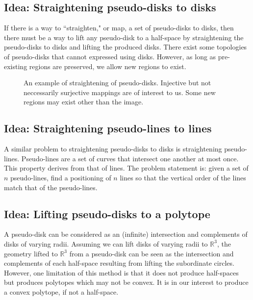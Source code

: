 \documentclass{NSF}
\begin{document}
\subsection{Idea: Straightening pseudo-disks to disks}
If there is a way to ``straighten," or map, a set of pseudo-disks to disks, then there must be a way to lift any pseudo-disk to a half-space by straightening the pseudo-disks to disks and lifting the produced disks. There exist some topologies of pseudo-disks that cannot expressed using disks. However, as long as pre-existing regions are preserved, we allow new regions to exist.

\begin{figure}[ht]
\caption{An example of straightening of pseudo-disks. Injective but not neccessarily surjective mappings are of interest to us. Some new regions may exist other than the image.}
\label{fig:topologically-impossible}
\end{figure}

\subsection{Idea: Straightening pseudo-lines to lines}
A similar problem to straightening pseudo-disks to disks is straightening pseudo-lines. Pseudo-lines are a set of curves that intersect one another at most once. This property derives from that of lines. The problem statement is:  given a set of $n$ pseudo-lines, find a positioning of $n$ lines so that the vertical order of the lines match that of the pseudo-lines.



\subsection{Idea: Lifting pseudo-disks to a polytope}
A pseudo-disk can be considered as an (infinite) intersection and complements of disks of varying radii. Assuming we can lift disks of varying radii to $\mathbb{R}^3$, the geometry lifted to $\mathbb{R}^3$  from a pseudo-disk can be seen as the intersection and complements of each half-space resulting from lifting the subordinate circles. However, one limitation of this method is that it does not produce half-spaces but produces polytopes which may not be convex. It is in our interest to produce a convex polytope, if not a half-space.
\end{document}

